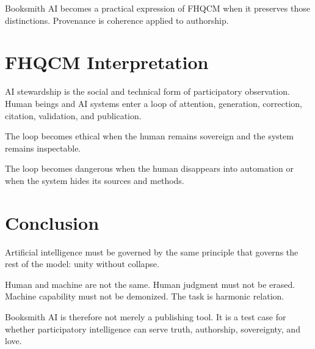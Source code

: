 Booksmith AI becomes a practical expression of FHQCM when it preserves those distinctions. Provenance is coherence applied to authorship.

\section{FHQCM Interpretation}

AI stewardship is the social and technical form of participatory observation. Human beings and AI systems enter a loop of attention, generation, correction, citation, validation, and publication.

The loop becomes ethical when the human remains sovereign and the system remains inspectable.

The loop becomes dangerous when the human disappears into automation or when the system hides its sources and methods.

\section{Conclusion}

Artificial intelligence must be governed by the same principle that governs the rest of the model: unity without collapse.

Human and machine are not the same. Human judgment must not be erased. Machine capability must not be demonized. The task is harmonic relation.

Booksmith AI is therefore not merely a publishing tool. It is a test case for whether participatory intelligence can serve truth, authorship, sovereignty, and love.
